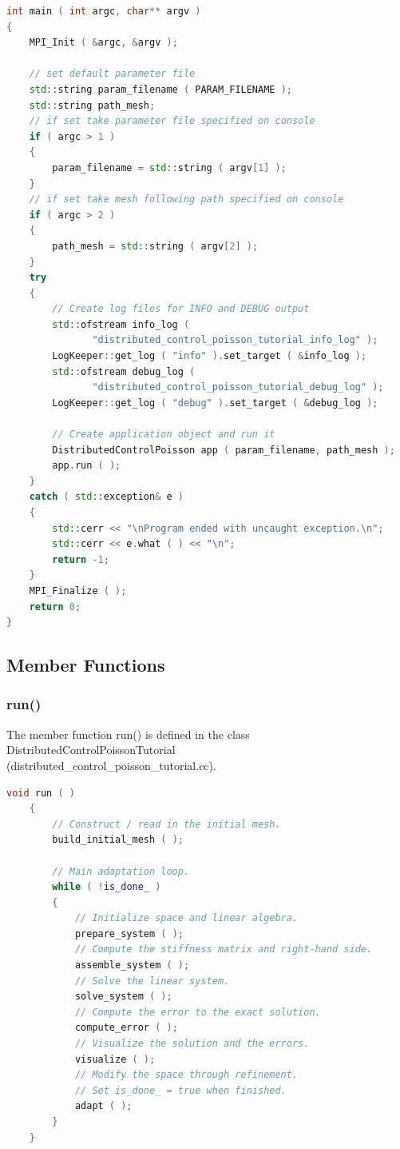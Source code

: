\documentclass[a4paper, 11pt, twoside]{article}
\begin{document}
\begin{lstlisting}[language=C++, basicstyle={\footnotesize, \ttfamily}, keywordstyle=\color{blue}, numbers=none, tabsize=4]
int main ( int argc, char** argv )
{
    MPI_Init ( &argc, &argv );

    // set default parameter file
    std::string param_filename ( PARAM_FILENAME );
    std::string path_mesh;
    // if set take parameter file specified on console
    if ( argc > 1 )
    {
        param_filename = std::string ( argv[1] );
    }
    // if set take mesh following path specified on console
    if ( argc > 2 )
    {
        path_mesh = std::string ( argv[2] );
    }
    try
    {
        // Create log files for INFO and DEBUG output
        std::ofstream info_log ( 
               "distributed_control_poisson_tutorial_info_log" );
        LogKeeper::get_log ( "info" ).set_target ( &info_log );
        std::ofstream debug_log ( 
               "distributed_control_poisson_tutorial_debug_log" );
        LogKeeper::get_log ( "debug" ).set_target ( &debug_log );

        // Create application object and run it
        DistributedControlPoisson app ( param_filename, path_mesh );
        app.run ( );
    }
    catch ( std::exception& e )
    {
        std::cerr << "\nProgram ended with uncaught exception.\n";
        std::cerr << e.what ( ) << "\n";
        return -1;
    }
    MPI_Finalize ( );
    return 0;
}
\end{lstlisting}

\subsection{Member Functions}
\subsubsection{run()}
The member function run() is defined in the class DistributedControlPoissonTutorial \\
(distributed\_control\_poisson\_tutorial.cc).

\begin{lstlisting}[language=C++, basicstyle={\footnotesize, \ttfamily}, keywordstyle=\color{blue}, numbers=none, tabsize=4]
    void run ( )
    {
        // Construct / read in the initial mesh.
        build_initial_mesh ( );

        // Main adaptation loop.
        while ( !is_done_ )
        {
            // Initialize space and linear algebra.
            prepare_system ( );
            // Compute the stiffness matrix and right-hand side.
            assemble_system ( );
            // Solve the linear system.
            solve_system ( );
            // Compute the error to the exact solution.
            compute_error ( );
            // Visualize the solution and the errors.
            visualize ( );
            // Modify the space through refinement. 
            // Set is_done_ = true when finished.
            adapt ( );
        }
    }
\end{lstlisting}
\end{document}
